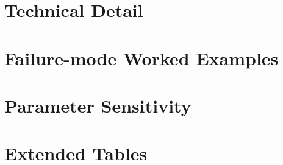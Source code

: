 \documentclass[11pt,a4paper]{article}
\begin{document}
\section{Technical Detail}


\section{Failure-mode Worked Examples}


\section{Parameter Sensitivity}


\section{Extended Tables}




\end{document}
